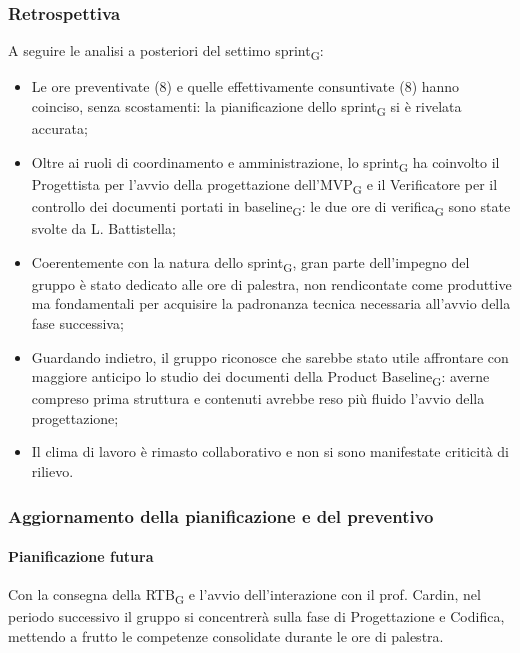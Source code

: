 ﻿\documentclass[a4paper, 10pt, colorlinks=true, linkcolor=black, urlcolor=blue, citecolor=blue, hidelinks]{article}
\begin{document}
\subsubsection{Retrospettiva}
A seguire le analisi a posteriori del settimo sprint\textsubscript{G}:
\begin{itemize}
    \item Le ore preventivate (8) e quelle effettivamente consuntivate (8) hanno coinciso, senza scostamenti: la pianificazione dello sprint\textsubscript{G} si è rivelata accurata;
    \item Oltre ai ruoli di coordinamento e amministrazione, lo sprint\textsubscript{G} ha coinvolto il Progettista per l'avvio della progettazione dell'MVP\textsubscript{G} e il Verificatore per il controllo dei documenti portati in baseline\textsubscript{G}: le due ore di verifica\textsubscript{G} sono state svolte da L. Battistella;
    \item Coerentemente con la natura dello sprint\textsubscript{G}, gran parte dell'impegno del gruppo è stato dedicato alle ore di palestra, non rendicontate come produttive ma fondamentali per acquisire la padronanza tecnica necessaria all'avvio della fase successiva;
    \item Guardando indietro, il gruppo riconosce che sarebbe stato utile affrontare con maggiore anticipo lo studio dei documenti della Product Baseline\textsubscript{G}: averne compreso prima struttura e contenuti avrebbe reso più fluido l'avvio della progettazione;
    \item Il clima di lavoro è rimasto collaborativo e non si sono manifestate criticità di rilievo.
\end{itemize}

\subsubsection{Aggiornamento della pianificazione e del preventivo}

\paragraph{Pianificazione futura}
Con la consegna della RTB\textsubscript{G} e l'avvio dell'interazione con il prof. Cardin, nel periodo successivo il gruppo si concentrerà sulla fase di Progettazione e Codifica, mettendo a frutto le competenze consolidate durante le ore di palestra.
\end{document}
